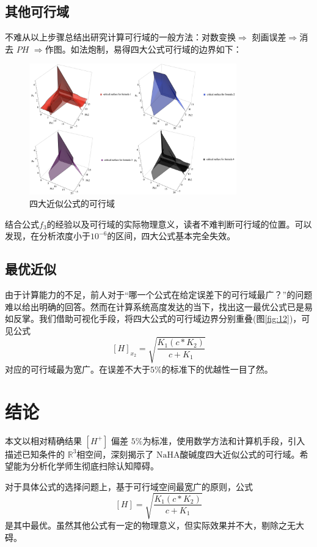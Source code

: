 \documentclass[UTF-8]{ctexart}
\newcommand{\R}{\mathbb{R}}
\newcommand{\0}{\boldsymbol{0}}
\begin{document}
\subsection{其他可行域}
不难从以上步骤总结出研究计算可行域的一般方法：对数变换$ \Rightarrow $ 刻画误差$ \Rightarrow $消去 $PH$ $\Rightarrow $作图。如法炮制，易得四大公式可行域的边界如下：

\begin{figure}[ht]
    \centering
    \includegraphics[width=0.8\textwidth]{四大.png}
    \caption{\kaishu 四大近似公式的可行域}
    \label{fig:四大}
\end{figure}
结合公式$f_3$的经验以及可行域的实际物理意义，读者不难判断可行域的位置。可以发现，在分析浓度小于$10^{-6}$的区间，四大公式基本完全失效。

\subsection{最优近似}
由于计算能力的不足，前人对于“哪一个公式在给定误差下的可行域最广？”的问题难以给出明确的回答。然而在计算系统高度发达的当下，找出这一最优公式已是易如反掌。我们借助可视化手段，将四大公式的可行域边界分别重叠(图\ref{fig:12})，可见公式
\[
    [H]_{x_2}= \sqrt{     \frac{K_1(c *K_2)}  {c+K_1} }
\]
对应的可行域最为宽广。在误差不大于$5\%$的标准下的优越性一目了然。

\section{结论}
本文以相对精确结果 $[H^+]$ 偏差 $5\% $为标准，使用数学方法和计算机手段，引入描述已知条件的 $\R^3 $相空间，深刻揭示了 $\text{NaHA} $酸碱度四大近似公式的可行域。希望能为分析化学师生彻底扫除认知障碍。

对于具体公式的选择问题上，基于可行域空间最宽广的原则，公式
\[
[H]= \sqrt{     \frac{K_1(c *K_2)}  {c+K_1} }
\]
是其中最优。虽然其他公式有一定的物理意义，但实际效果并不大，剔除之无大碍。
\end{document}
